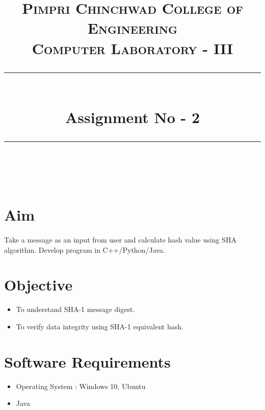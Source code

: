 \documentclass[a4paper,12pt]{article}
\title{
	\normalfont \normalsize 
	\textsc{Pimpri Chinchwad College of Engineering \\ 
		Computer Laboratory - III} \\
	[10pt] 
	\rule{\linewidth}{0.5pt} \\[6pt] 
	\huge Assignment No - 2 \\
	\rule{\linewidth}{2pt}  \\[10pt]
}
\author{}
\date{\normalsize}
\newenvironment{codefont}{\fontfamily{pcr}\selectfont}{\par}
\begin{document}
\maketitle

\section{Aim}
	\paragraph{} Take a message as an input from user and calculate hash value using SHA algorithm. Develop program in C++/Python/Java.
	
\section{Objective}
	\begin{itemize}
		\item To understand SHA-1 message digest.
		\item To verify data integrity using SHA-1 equivalent hash. 
	\end{itemize}
	
\section{Software Requirements}
	\begin{itemize}
		\item	Operating System : Windows 10, Ubuntu
		\item	Java
		 
	\end{itemize}
	
\end{document}

